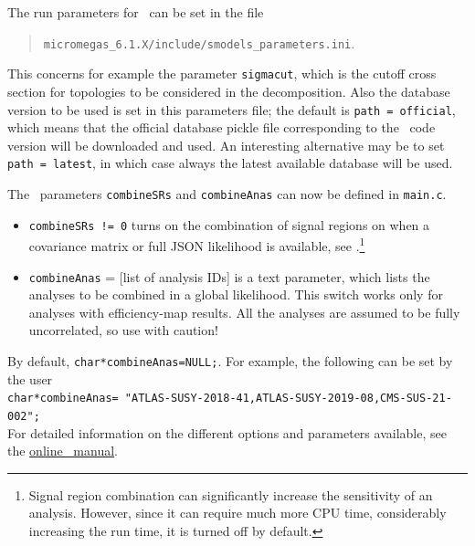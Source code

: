\documentclass[12pt,a4paper]{article}
\begin{document}
The run parameters for \smodels\ can be set in the file
\begin{quote}
    \verb|micromegas_6.1.X/include/smodels_parameters.ini|.
 \end{quote}
This concerns for example the parameter \verb|sigmacut|, 
which is the cutoff cross section for topologies to be considered in the decomposition. 
Also the database version to be used is set in this parameters file; the default is {\tt path = official}, which means that the official database pickle file corresponding to the \smodels\ code version will be downloaded and used. An interesting alternative may be to set {\tt path = latest}, in which case always the latest available database will be used. 

The \smodels\ parameters {\tt combineSRs} and 
{\tt combineAnas} can now be defined in {\tt main.c}.\\
\begin{itemize}
	\item \verb|combineSRs != 0|  turns on the combination of signal regions on when a covariance matrix or full JSON likelihood is available, see \cite{Ambrogi:2018ujg,Alguero:2020grj}.\footnote{Signal region combination can significantly increase the sensitivity of an analysis. However, since it can require much more CPU time, considerably increasing the run time, it is turned off by default.}
	\item \verb|combineAnas| = [list of analysis IDs]  is a text parameter, which lists the analyses to be combined in a global likelihood. This switch works only for analyses with efficiency-map results. All the analyses are assumed to be fully uncorrelated, so use with caution!
\end{itemize}	
By default,  \verb|char*combineAnas=NULL;|. For example, the following can be set by the user \\
\verb|char*combineAnas= "ATLAS-SUSY-2018-41,ATLAS-SUSY-2019-08,CMS-SUS-21-002";|\\ 
For detailed information on the different options and parameters available, see the 
\href{https://smodels.readthedocs.io/en/latest/RunningSModelS.html}{online \smodels\ manual}.
\end{document}
